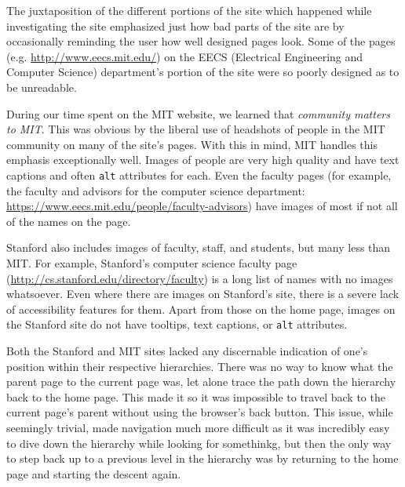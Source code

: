 The juxtaposition of the different portions of the site which happened while investigating the site emphasized just how bad parts
of the site are by occasionally reminding the user how well designed pages look. Some of the pages (e.g.
\url{http://www.eecs.mit.edu/}) on the EECS (Electrical Engineering and Computer Science) department's portion of the
site were so poorly designed as to be unreadable.

During our time spent on the MIT website, we learned that \textit{community
matters to MIT}. This was obvious by the liberal use of headshots of people in
the MIT community on many of the site's pages. With this in mind, MIT handles
this emphasis exceptionally well. Images of people are very high quality and
have text captions and often \texttt{alt} attributes for each. Even the faculty
pages (for example, the faculty and advisors for the computer science department:
\url{https://www.eecs.mit.edu/people/faculty-advisors}) have images of most if
not all of the names on the page.

Stanford also includes images of faculty, staff, and students, but many less
than MIT. For example, Stanford's computer science faculty page
(\url{http://cs.stanford.edu/directory/faculty}) is a long list of names
with no images whatsoever. Even where there are images on Stanford's site,
there is a severe lack of accessibility features for them. Apart from those
on the home page, images on the Stanford site do not have tooltips, text
captions, or \texttt{alt} attributes.

Both the Stanford and MIT sites lacked any discernable indication of one's position within their respective hierarchies.
There was no way to know what the parent page to the current page was, let alone trace the path down the hierarchy back to
the home page. This made it so it was impossible to travel back to the current page's parent without using the browser's back
button. This issue, while seemingly trivial, made navigation much more difficult as it was incredibly easy to dive down the
hierarchy while looking for somethinkg, but then the only way to step back up to a previous level in the hierarchy was by returning
to the home page and starting the descent again.

